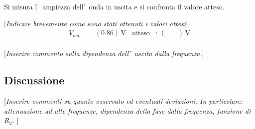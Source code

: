 \documentclass[10pt,a4paper]{article}
\newcommand{\rem}[1]{[\emph{#1}]}
\newcommand{\exn}{\phantom{xxx}}
\begin{document}
Si misura l'~ampiezza dell'~onda  in uscita e si confronta il valore atteso.

\rem{Indicare brevemente come sono stati ottenuti i valori attesi}
\begin{align*}
V_{out} &= (0.86 )\,\mathrm{V} & \mathrm{atteso} &:\,(\exn  )\, \mathrm{V}  \\
\end{align*}

\rem{Inserire commento sulla dipendenza dell'~uscita dalla frequenza.}
%

\subsection{Discussione}

\rem{Inserire commenti su quanto osservato ed eventuali deviazioni. 
In particolare: attenuazione ad alte frequenze, dipendenza della fase dalla frequenza, funzione di $R_2$. }

\end{document}
